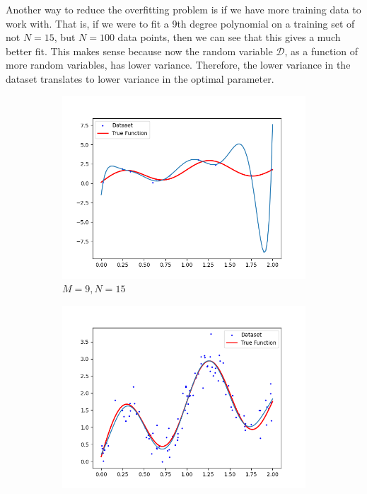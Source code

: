 \documentclass{article}
\theoremstyle{definition}
\begin{document}
      Another way to reduce the overfitting problem is if we have more training data to work with. That is, if we were to fit a 9th degree polynomial on a training set of not $N = 15$, but $N = 100$ data points, then we can see that this gives a much better fit. This makes sense because now the random variable $\mathcal{D}$, as a function of more random variables, has lower variance. Therefore, the lower variance in the dataset translates to lower variance in the optimal parameter. 

      \begin{figure}[hbt!]
        \centering
        \begin{subfigure}[b]{0.48\textwidth}
        \centering
          \includegraphics[width=\textwidth]{img/poly_9_fit.png}
          \caption{$M = 9, N = 15$}
          \label{fig:less_points}
        \end{subfigure}
        \hfill 
        \begin{subfigure}[b]{0.48\textwidth}
        \centering
          \includegraphics[width=\textwidth]{img/increased_data.png}

\end{subfigure}
\end{figure}
\end{document}
